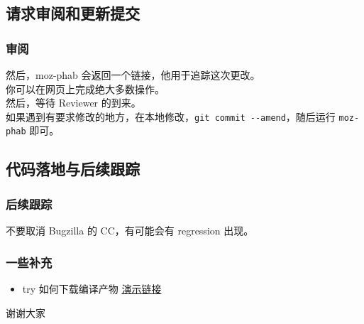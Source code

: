 \documentclass[UTF-8]{ctexbeamer}
\begin{document}
\subsection{请求审阅和更新提交}
\begin{frame}[fragile]
	\frametitle{审阅}
	然后，moz-phab 会返回一个链接，他用于追踪这次更改。\\
	你可以在网页上完成绝大多数操作。\\
	然后，等待 Reviewer 的到来。\\
	如果遇到有要求修改的地方，在本地修改，\verb|git commit --amend|，随后运行 \verb|moz-phab| 即可。
\end{frame}

\subsection{代码落地与后续跟踪}

\begin{frame}[fragile]
	\frametitle{后续跟踪}
	不要取消 Bugzilla 的 CC，有可能会有 regression 出现。
\end{frame}

\begin{frame}
	\frametitle{一些补充}
	
	\begin{itemize}
		\item try 如何下载编译产物 \href{https://bugzilla.mozilla.org/show\_bug.cgi?id=1756400}{演示链接}
	\end{itemize}
	
\end{frame}

\begin{frame}
	\begin{center}
		\huge{谢谢大家}
	\end{center}

\end{frame}
\end{document}
